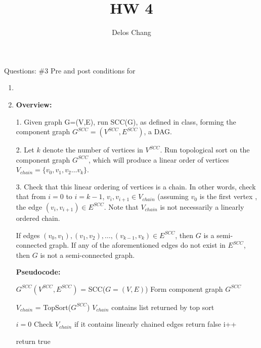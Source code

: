 \documentclass[a4paper]{report}
\title{HW 4}
\author{Delos Chang}
\date{}
\begin{document}
    Questions:
      \#3 Pre and post conditions for 
  \begin{enumerate}
    \item 


    \par
    \bigskip

    \item 
      {\bf Overview:}

      1. Given graph G=(V,E), run SCC(G), as defined in class, 
      forming the component graph $G^{SCC} = (V^{SCC}, E^{SCC})$, a DAG. 

      2. Let $k$ denote the number of vertices in $V^{SCC}$. Run topological sort on the component graph $G^{SCC}$, 
      which will produce a linear order of vertices $V_{chain} = \{v_{0}, v_{1}, v_{2} \dots v_{k}\}$. 

      3. Check that this linear ordering of vertices is a chain. 
      In other words, check that from $i=0$ to $i=k-1$, $v_{i},v_{i+1} \in V_{chain}$ (assuming $v_{0}$ is the first vertex
      , the edge $(v_{i},v_{i+1}) \in E^{SCC}$.
      Note that $V_{chain}$ is not necessarily a linearly ordered chain.

      If edges $(v_{0}, v_{1}), (v_{1},v_{2}),\dots,(v_{k-1},v_{k}) \in E^{SCC}$, then $G$ is a semi-connected graph.
      If any of the aforementioned edges do not exist in $E^{SCC}$, then $G$ is not a semi-connected graph. 

      {\bf Pseudocode:}

      \begin{algorithmic}[1]

        \State $G^{SCC}(V^{SCC},E^{SCC})$ = SCC($G=(V,E)$)
        \Comment Form component graph $G^{SCC}$

        \State $V_{chain}$ = TopSort($G^{SCC}$)
        \Comment $V_{chain}$ contains list returned by top sort

        \State $i=0$
        \Comment Check $V_{chain}$ if it contains linearly chained edges
            \State return false
          \EndIf
          \State i++

        \EndWhile
        \State return true
      \EndFunction
    \end{algorithmic}


\end{enumerate}
\end{document}
